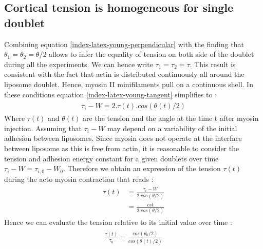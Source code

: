 \documentclass[A4paperpaper,11pt,english]{sphinxmanual}
\begin{document}
\subsection{Cortical tension is homogeneous for single doublet}
\label{index-latex:cortical-tension-is-homogeneous-for-single-doublet}
Combining equation \eqref{index-latex-young-perpendicular} with the finding that \(\theta_1 = \theta_2 = \theta
/2\) allows to infer the equality of tension on both side of the doublet during all the
experiments. We can hence write \(\tau_1 = \tau_2 = \tau\). This result is
consistent with the fact that actin is distributed continuously all around the
liposome doublet. Hence, myosin II minifilaments pull on a continuous shell. In
these conditions equation \eqref{index-latex-young-tangent} simplifies to :
\label{index-latex:equation-eq3}\begin{gather}
\begin{split}\tau_i - W = 2.\tau(t).cos(\theta(t)/2)\end{split}\label{index-latex-eq3}
\end{gather}
Where \(\tau(t)\) and \(\theta(t)\) are the tension and the angle at
the time t after myosin injection. Assuming that
\(\tau_i-W\) may depend on a variability of the initial adhesion between
liposomes. Since myosin does not operate at the interface between liposome as
this is free from actin, it is reasonable to consider the tension and
adhesion energy constant for a given doublets over time
\(\tau_i-W = \tau_{i,0}-W_0\).
Therefore we obtain an expression of the tension \(\tau(t)\) during the acto myosin contraction that reads :
\label{index-latex:equation-eqtime}\begin{gather}
\begin{split}\tau(t) &= \frac{ \tau_i - W }{2.cos(\theta/2)}\\
        &= \frac{ cst           }{2.cos(\theta/2)}\end{split}\label{index-latex-eqtime}
\end{gather}
Hence we can evaluate the tension relative to its initial value over time :
\label{index-latex:equation-eqa402a}\begin{gather}
\begin{split}\frac{ \tau(t) }{\tau_0} = \frac{cos(\theta_0/2)}{cos(\theta(t)/2)}\end{split}\label{index-latex-eqa402a}
\end{gather}
\end{document}
